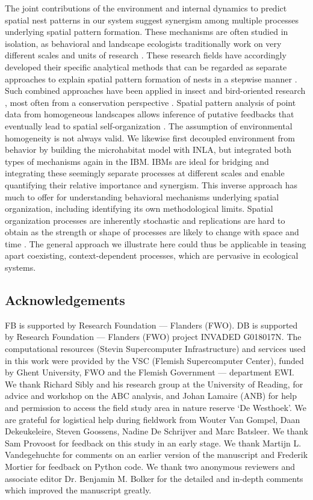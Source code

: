 \documentclass[10pt, twoside]{book} %
\begin{document}
	The joint contributions of the environment and internal dynamics to predict spatial nest patterns in our system suggest synergism among multiple processes underlying spatial pattern formation. These mechanisms are often studied in isolation, as behavioral and landscape ecologists traditionally work on very different scales and units of research \citep{lima1996}. These research fields have accordingly developed their specific analytical methods that can be regarded as separate approaches to explain spatial pattern formation of nests in a stepwise manner \citep{melles2009}. Such combined approaches have been applied in insect \citep{polidori2008, asis2014} and bird-oriented research \citep{brown2000, perry2003, melles2009}, most often from a conservation perspective \citep{etterson2003, ward2004, bayard2010, swift2017}. Spatial pattern analysis of point data from homogeneous landscapes allows inference of putative feedbacks that eventually lead to spatial self-organization \citep{rietkerk2008}. The assumption of environmental homogeneity is not always valid. We likewise first decoupled environment from behavior by building the microhabitat model with INLA, but integrated both types of mechanisms again in the IBM. IBMs are ideal for bridging and integrating these seemingly separate processes at different scales and enable quantifying their relative importance and synergism. This inverse approach has much to offer for understanding behavioral mechanisms underlying spatial organization, including identifying its own methodological limits. Spatial organization processes are inherently stochastic and replications are hard to obtain as the strength or shape of processes are likely to change with space and time \citep{wagner2005}. The general approach we illustrate here could thus be applicable in teasing apart coexisting, context-dependent processes, which are pervasive in ecological systems.\\
	
	\clearpage
	\subsection*{Acknowledgements}
	FB is supported by Research Foundation --- Flanders (FWO). DB is supported by Research Foundation --- Flanders (FWO) project INVADED G018017N. The computational resources (Stevin Supercomputer Infrastructure) and services used in this work were provided by the VSC (Flemish Supercomputer Center), funded by Ghent University, FWO and the Flemish Government --- department EWI. We thank Richard Sibly and his research group at the University of Reading, for advice and workshop on the ABC analysis, and Johan Lamaire (ANB) for help and permission to access the field study area in nature reserve `De Westhoek'. We are grateful for logistical help during fieldwork from Wouter Van Gompel, Daan Dekeukeleire, Steven Goossens, Nadine De Schrijver and Marc Batsleer. We thank Sam Provoost for feedback on this study in an early stage. We thank Martijn L. Vandegehuchte for comments on an earlier version of the manuscript and Frederik Mortier for feedback on Python code. We thank two anonymous reviewers and associate editor Dr. Benjamin M. Bolker for the detailed and in-depth comments which improved the manuscript greatly.
	
\end{document}
